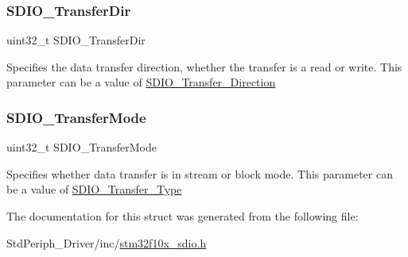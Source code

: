 \subsubsection{\texorpdfstring{SDIO\_TransferDir}{SDIO\_TransferDir}}
{\footnotesize\ttfamily uint32\+\_\+t S\+D\+I\+O\+\_\+\+Transfer\+Dir}

Specifies the data transfer direction, whether the transfer is a read or write. This parameter can be a value of \mbox{\hyperlink{group___s_d_i_o___transfer___direction}{S\+D\+I\+O\+\_\+\+Transfer\+\_\+\+Direction}} \mbox{\label{struct_s_d_i_o___data_init_type_def_ab5a77921227a04c3aeb383b794c2a64c}} 
\subsubsection{\texorpdfstring{SDIO\_TransferMode}{SDIO\_TransferMode}}
{\footnotesize\ttfamily uint32\+\_\+t S\+D\+I\+O\+\_\+\+Transfer\+Mode}

Specifies whether data transfer is in stream or block mode. This parameter can be a value of \mbox{\hyperlink{group___s_d_i_o___transfer___type}{S\+D\+I\+O\+\_\+\+Transfer\+\_\+\+Type}} 

The documentation for this struct was generated from the following file\+:\begin{DoxyCompactItemize}
\item 
Std\+Periph\+\_\+\+Driver/inc/\mbox{\hyperlink{stm32f10x__sdio_8h}{stm32f10x\+\_\+sdio.\+h}}\end{DoxyCompactItemize}
